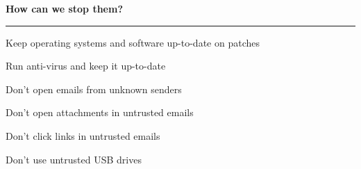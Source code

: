 \begin{mdframed}
\textbf{How can we stop them?}
\hrule
\begin{description}
\item Keep operating systems and software up-to-date on patches
\item Run anti-virus and keep it up-to-date
\item Don't open emails from unknown senders
\item Don't open attachments in untrusted emails
\item Don't click links in untrusted emails
\item Don't use untrusted USB drives
\end{description}
\end{mdframed}